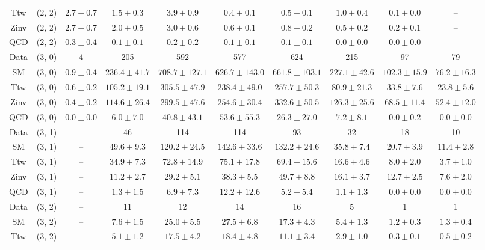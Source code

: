 \begin{table}[h!]
{\begin{tabular}{cccccccccc}
	Ttw & (2, 2) & $2.7\pm 0.7$ & $1.5\pm 0.3$ & $3.9\pm 0.9$ & $0.4\pm 0.1$ & $0.5\pm 0.1$ & $1.0\pm 0.4$ & $0.1\pm 0.0$ & -- \\[0.5ex] 
	Zinv & (2, 2) & $2.7\pm 0.7$ & $2.0\pm 0.5$ & $3.0\pm 0.6$ & $0.6\pm 0.1$ & $0.8\pm 0.2$ & $0.5\pm 0.2$ & $0.2\pm 0.1$ & -- \\[0.5ex] 
	QCD & (2, 2) & $0.3\pm 0.4$ & $0.1\pm 0.1$ & $0.2\pm 0.2$ & $0.1\pm 0.1$ & $0.1\pm 0.1$ & $0.0\pm 0.0$ & $0.0\pm 0.0$ & -- \\[0.5ex] 
	Data & (3, 0) & 4 & 205 & 592 & 577 & 624 & 215 & 97 & 79 \\[0.5ex] 
	SM & (3, 0) & $0.9\pm 0.4$ & $236.4\pm 41.7$ & $708.7\pm 127.1$ & $626.7\pm 143.0$ & $661.8\pm 103.1$ & $227.1\pm 42.6$ & $102.3\pm 15.9$ & $76.2\pm 16.3$ \\[0.5ex] 
	Ttw & (3, 0) & $0.6\pm 0.2$ & $105.2\pm 19.1$ & $305.5\pm 47.9$ & $238.4\pm 49.0$ & $257.7\pm 50.3$ & $80.9\pm 21.3$ & $33.8\pm 7.6$ & $23.8\pm 5.6$ \\[0.5ex] 
	Zinv & (3, 0) & $0.4\pm 0.2$ & $114.6\pm 26.4$ & $299.5\pm 47.6$ & $254.6\pm 30.4$ & $332.6\pm 50.5$ & $126.3\pm 25.6$ & $68.5\pm 11.4$ & $52.4\pm 12.0$ \\[0.5ex] 
	QCD & (3, 0) & $0.0\pm 0.0$ & $6.0\pm 7.0$ & $40.8\pm 43.1$ & $53.6\pm 55.3$ & $26.3\pm 27.0$ & $7.2\pm 8.1$ & $0.0\pm 0.2$ & $0.0\pm 0.0$ \\[0.5ex] 
	Data & (3, 1) & -- & 46 & 114 & 114 & 93 & 32 & 18 & 10 \\[0.5ex] 
	SM & (3, 1) & -- & $49.6\pm 9.3$ & $120.2\pm 24.5$ & $142.6\pm 33.6$ & $132.2\pm 24.6$ & $35.8\pm 7.4$ & $20.7\pm 3.9$ & $11.4\pm 2.8$ \\[0.5ex] 
	Ttw & (3, 1) & -- & $34.9\pm 7.3$ & $72.8\pm 14.9$ & $75.1\pm 17.8$ & $69.4\pm 15.6$ & $16.6\pm 4.6$ & $8.0\pm 2.0$ & $3.7\pm 1.0$ \\[0.5ex] 
	Zinv & (3, 1) & -- & $11.2\pm 2.7$ & $29.2\pm 5.1$ & $38.3\pm 5.5$ & $49.7\pm 8.8$ & $16.1\pm 3.7$ & $12.7\pm 2.5$ & $7.6\pm 2.0$ \\[0.5ex] 
	QCD & (3, 1) & -- & $1.3\pm 1.5$ & $6.9\pm 7.3$ & $12.2\pm 12.6$ & $5.2\pm 5.4$ & $1.1\pm 1.3$ & $0.0\pm 0.0$ & $0.0\pm 0.0$ \\[0.5ex] 
	Data & (3, 2) & -- & 11 & 12 & 14 & 16 & 5 & 1 & 1 \\[0.5ex] 
	SM & (3, 2) & -- & $7.6\pm 1.5$ & $25.0\pm 5.5$ & $27.5\pm 6.8$ & $17.3\pm 4.3$ & $5.4\pm 1.3$ & $1.2\pm 0.3$ & $1.3\pm 0.4$ \\[0.5ex] 
	Ttw & (3, 2) & -- & $5.1\pm 1.2$ & $17.5\pm 4.2$ & $18.4\pm 4.8$ & $11.1\pm 3.4$ & $2.9\pm 1.0$ & $0.3\pm 0.1$ & $0.5\pm 0.2$ \\[0.5ex] 

\end{tabular}}
\end{table}
